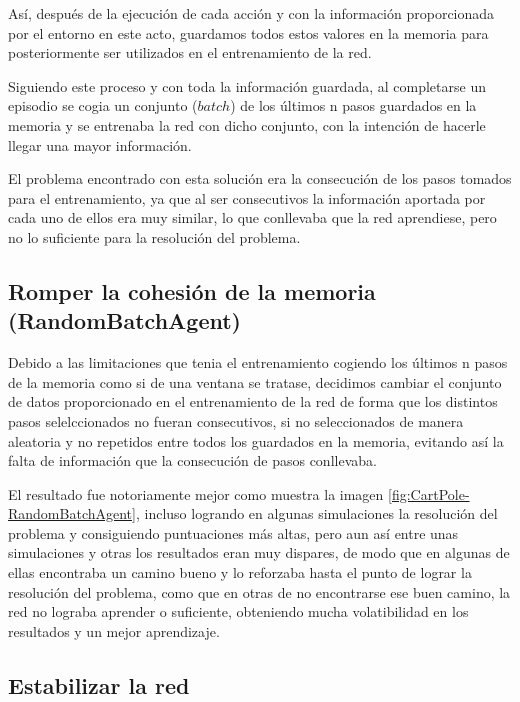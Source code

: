 Así, después de la ejecución de cada acción y con la información proporcionada por el entorno en este acto, guardamos todos estos valores en la memoria para posteriormente ser utilizados en el entrenamiento de la red.

Siguiendo este proceso y con toda la información guardada, al completarse un episodio se cogia un conjunto ($batch$) de los últimos n pasos guardados en la memoria y se entrenaba la red con dicho conjunto, con la intención de hacerle llegar una mayor información.

El problema encontrado con esta solución era la consecución de los pasos tomados para el entrenamiento, ya que al ser consecutivos la información aportada por cada uno de ellos era muy similar, lo que conllevaba que la red aprendiese, pero no lo suficiente para la resolución del problema.

\subsection{Romper la cohesión de la memoria (RandomBatchAgent)}

Debido a las limitaciones que tenia el entrenamiento cogiendo los últimos n pasos de la memoria como si de una ventana se tratase, decidimos cambiar el conjunto de datos proporcionado en el entrenamiento de la red de forma que los distintos pasos selelccionados no fueran consecutivos, si no seleccionados de manera aleatoria y no repetidos entre todos los guardados en la memoria, evitando así la falta de información que la consecución de pasos conllevaba.

El resultado fue notoriamente mejor como muestra la imagen \ref{fig:CartPole-RandomBatchAgent}, incluso logrando en algunas simulaciones la resolución del problema y consiguiendo puntuaciones más altas, pero aun así entre unas simulaciones y otras los resultados eran muy dispares, de modo que en algunas de ellas encontraba un camino bueno y lo reforzaba hasta el punto de lograr la resolución del problema, como que en otras de no encontrarse ese buen camino, la red no lograba aprender o suficiente, obteniendo mucha volatibilidad en los resultados y un mejor aprendizaje.


\subsection{Estabilizar la red}


